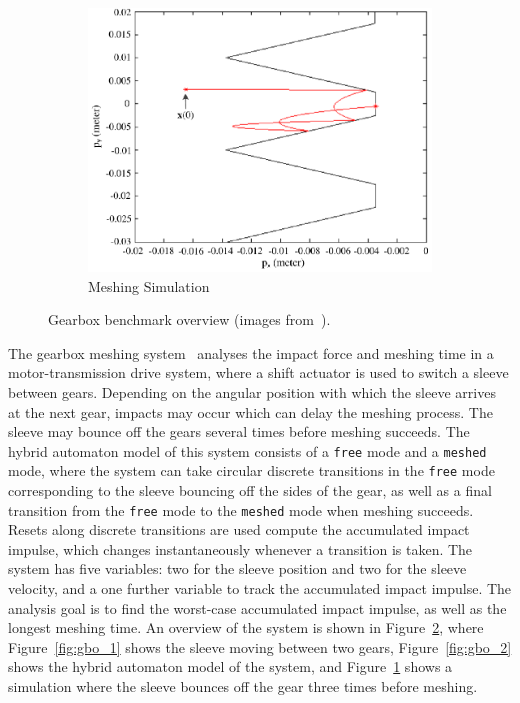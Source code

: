 \begin{figure}[t]
\begin{subfigure}{0.3\textwidth}
    \includegraphics[width=1.0\textwidth]{images/gb_overview3.png}
    \caption{Meshing Simulation}\label{fig:gbo_3}
\end{subfigure}
\vspace{-0.15cm}
\caption{Gearbox benchmark overview (images from~\cite{chen2014motor}).}\label{fig:gb_overview}
\vspace{-0.15cm}
\end{figure}

The gearbox meshing system~\cite{chen2014motor} analyses the impact force and meshing time in a motor-transmission drive system,
where a shift actuator is used to switch a sleeve between gears.
%
Depending on the angular position with which the sleeve arrives at the next gear, impacts may occur which can delay the meshing process.
%
The sleeve may bounce off the gears several times before meshing succeeds.
%
The hybrid automaton model of this system consists of a \texttt{free} mode and a \texttt{meshed} mode, where the system can take circular
discrete transitions in the \texttt{free} mode corresponding to the sleeve bouncing off the sides of the gear, as well as a final transition
from the \texttt{free} mode to the \texttt{meshed} mode when meshing succeeds.
%
Resets along discrete transitions are used compute the accumulated impact impulse, which changes instantaneously whenever a transition is taken.
%
The system has five variables: two for the sleeve position and two for the sleeve velocity, and a one further variable to track the accumulated
impact impulse. 
%
The analysis goal is to find the worst-case accumulated impact impulse, as well as the longest meshing time.
%
An overview of the system is shown in Figure~\ref{fig:gb_overview}, where Figure~\ref{fig:gbo_1} shows the sleeve moving between two gears,
Figure~\ref{fig:gbo_2} shows the hybrid automaton model of the system, and Figure~\ref{fig:gbo_3} shows a simulation where the sleeve bounces off
the gear three times before meshing.

